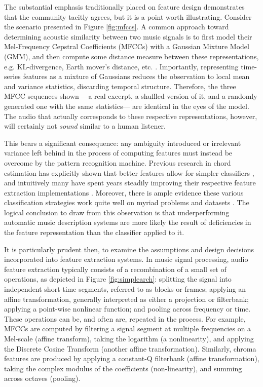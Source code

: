 The substantial emphasis traditionally placed on feature design demonstrates that the community tacitly agrees, but it is a point worth illustrating.
Consider the scenario presented in Figure \ref{fig:mfccs}.
A common approach toward determining acoustic similarity between two music signals is to first model their Mel-Frequency Cepstral Coefficients (MFCCs) with a Gaussian Mixture Model (GMM), and then compute some distance measure between these representations, e.g. KL-divergence, Earth mover's distance, etc. \cite{Berenzweig2004}.
Importantly, representing time-series features as a mixture of Gaussians reduces the observation to local mean and variance statistics, discarding temporal structure.
Therefore, the three MFCC sequences shown ---a real excerpt, a shuffled version of it, and a randomly generated one with the same statistics--- are identical in the eyes of the model.
The audio that actually corresponds to these respective representations, however, will certainly not \emph{sound} similar to a human listener.

This bears a significant consequence: any ambiguity introduced or irrelevant variance left behind in the process of computing features must instead be overcome by the pattern recognition machine.
Previous research in chord estimation has explicitly shown that better features allow for simpler classifiers \cite{Cho2011}, and intuitively many have spent years steadily improving their respective feature extraction implementations \cite{Lyon2010,Mueller2011b}.
Moreover, there is ample evidence these various classification strategies work quite well on myriad problems and datasets \cite{Bishop2006}.
The logical conclusion to draw from this observation is that underperforming automatic music description systems are more likely the result of deficiencies in the feature representation than the classifier applied to it.

It is particularly prudent then, to examine the assumptions and design decisions incorporated into feature extraction systems.
In music signal processing, audio feature extraction typically consists of a recombination of a small set of operations, as depicted in Figure \ref{fig:simplearch}: splitting the signal into independent short-time segments, referred to as blocks or frames; applying an affine transformation, generally interpreted as either a projection or filterbank; applying a point-wise nonlinear function; and pooling across frequency or time.
These operations can be, and often are, repeated in the process.
For example, MFCCs are computed by filtering a signal segment at multiple frequencies on a Mel-scale (affine transform), taking the logarithm (a nonlinearity), and applying the Discrete Cosine Transform (another affine transformation).
Similarly, chroma features are produced by applying a constant-Q filterbank (affine transformation), taking the complex modulus of the coefficients (non-linearity), and summing across octaves (pooling).

